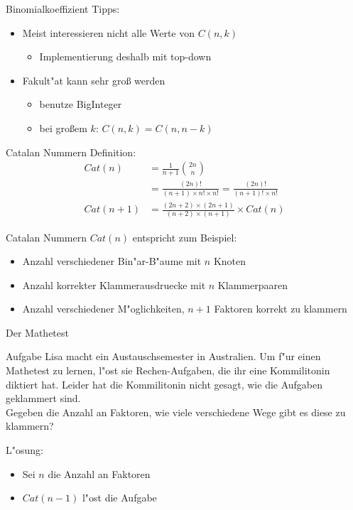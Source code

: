 \documentclass[18pt]{beamer}
\begin{document}
\begin{frame}{Binomialkoeffizient}
Tipps:
\begin{itemize}
\item Meist interessieren nicht alle Werte von $C \left( n, k \right)$
\begin{itemize}
\item Implementierung deshalb mit top-down
\end{itemize}
\item Fakult"at kann sehr groß werden
\begin{itemize}
\item benutze BigInteger
\item bei großem $k$: $C \left( n, k \right) = C \left( n, n-k \right)$
\end{itemize}
\end{itemize}
\end{frame}

\begin{frame}{Catalan Nummern}
Definition:
\begin{align*}
Cat \left( n \right) &= \frac{1}{n+1} \binom{2n}{n} \\
&= \frac{\left( 2n \right)!}{\left( n+1 \right) \times n! \times n!} = \frac{\left( 2n \right) !}{\left( n+1 \right) ! \times n!} \\
Cat \left( n + 1 \right) &= \frac{\left( 2n + 2 \right) \times \left( 2n + 1 \right)}{\left( n + 2 \right) \times \left( n + 1 \right)} \times Cat \left( n \right)
\end{align*}
\end{frame}

\begin{frame}{Catalan Nummern}
$Cat \left( n \right)$ entspricht zum Beispiel:
\begin{itemize}
\item Anzahl verschiedener Bin"ar-B"aume mit $n$ Knoten
\item Anzahl korrekter Klammerausdruecke mit $n$ Klammerpaaren
\item Anzahl verschiedener M"oglichkeiten, $n+1$ Faktoren korrekt zu klammern
\end{itemize}
\end{frame}

\begin{frame}{Der Mathetest}
\begin{block}{Aufgabe}
Lisa macht ein Austauschsemester in Australien. Um f"ur einen Mathetest zu lernen, l"ost sie Rechen-Aufgaben, die ihr eine Kommilitonin diktiert hat. Leider hat die Kommilitonin nicht gesagt, wie die Aufgaben geklammert sind. \\
Gegeben die Anzahl an Faktoren, wie viele verschiedene Wege gibt es diese zu klammern?
\end{block}
L"osung:
\begin{itemize}
\item Sei $n$ die Anzahl an Faktoren
\item $Cat \left( n-1 \right)$ l"ost die Aufgabe
\end{itemize}
\end{frame}
\end{document}
